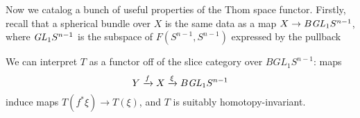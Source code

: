 Now we catalog a bunch of useful properties of the Thom space functor. Firstly, recall that a spherical bundle over $X$ is the same data as a map $X \to B \mathit{GL}_1 S^{n-1}$, where $\mathit{GL}_1 S^{n-1}$ is the subspace of $F(S^{n-1}, S^{n-1})$ expressed by the pullback
\begin{center}
\end{center}
We can interpret $T$ as a functor off of the slice category over $BGL_1 S^{n-1}$: maps \[Y \xrightarrow{f} X \xrightarrow{\xi} B \mathit{GL}_1 S^{n-1}\] induce maps $T(f^* \xi) \to T(\xi)$, and $T$ is suitably homotopy-invariant.

